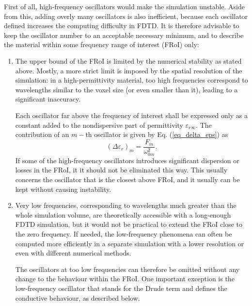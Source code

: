 First of all, high-frequency oscillators would make the simulation unstable.
Aside from this, adding overly many oscillators is also inefficient, because each oscillator defined increases the computing difficulty in FDTD. 
It is therefore advisable to keep the oscillator number to an acceptable necessary minimum, and to describe the material within some frequency range of interest (FRoI) %
only:
\begin{enumerate}
 \item{
The upper bound of the FRoI is limited by the numerical stability as stated above. Mostly, a more strict limit is imposed by the spatial resolution of the simulation: in a high-permittivity material, too high frequencies correspond to wavelengths similar to the voxel size (or even smaller than it), leading to a significant inaccuracy. 

Each oscillator far above the frequency of interest shall be expressed only as a constant added to the nondispersive part of permittivity $\varepsilon_{r\infty}$. The contribution of an $m-$th oscillator is given by Eq. (\ref{eq_delta_eps}) as 
$$(\Delta \varepsilon_r)_m = \frac{F_m}{\omega_{0m}^2}.$$ 
If some of the high-frequency oscillators introduces significant dispersion or losses in the FRoI, it it should not be eliminated this way. This usually concerns the oscillator that is the closest above FRoI, and it usually can be kept without causing instability.
} 
 \item{
Very low frequencies, corresponding to wavelengths much greater than the whole simulation volume, are theoretically accessible with a long-enough FDTD simulation, but it would not be practical to extend the FRoI close to the zero frequency. If needed, the low-frequency phenomena can often be computed more efficiently in a separate simulation with a lower resolution or even with different numerical methods.

The oscillators at too low frequencies can therefore be omitted without any change to the behaviour within the FRoI. One important exception is the low-frequency oscillator that stands for the Drude term and defines the conductive behaviour, as described below.
} 
 \end{enumerate}
